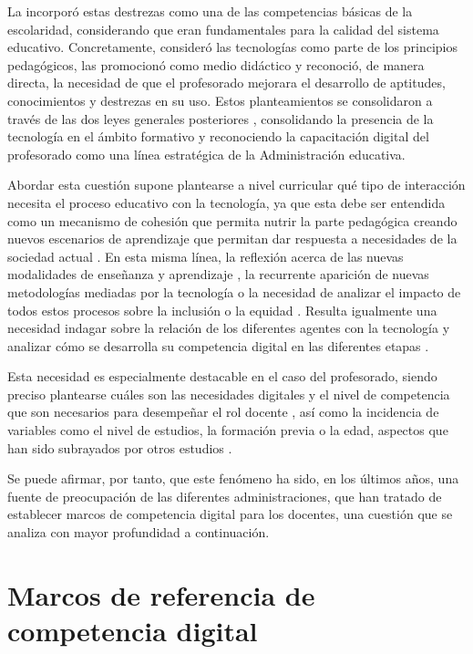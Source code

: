 \documentclass[spanish]{textolivre}
\begin{document}
La \textcite{de2006ley} incorporó estas destrezas como una de las competencias básicas de la escolaridad, considerando que eran fundamentales para la calidad del sistema educativo. Concretamente, consideró las tecnologías como parte de los principios pedagógicos, las promocionó como medio didáctico y reconoció, de manera directa, la necesidad de que el profesorado mejorara el desarrollo de aptitudes, conocimientos y destrezas en su uso. Estos planteamientos se consolidaron a través de las dos leyes generales posteriores \cite{de2013ley,de2020ley}, consolidando la presencia de la tecnología en el ámbito formativo y reconociendo la capacitación digital del profesorado como una línea estratégica de la Administración educativa.

Abordar esta cuestión supone plantearse a nivel curricular qué tipo de interacción necesita el proceso educativo con la tecnología, ya que esta debe ser entendida como un mecanismo de cohesión que permita nutrir la parte pedagógica creando nuevos escenarios de aprendizaje que permitan dar respuesta a necesidades de la sociedad actual \cite{luengo_horcajo_fortalezas_2021}. En esta misma línea, la reflexión acerca de las nuevas modalidades de enseñanza y aprendizaje \cite{lopez_belmonte_alisis_2019}, la recurrente aparición de nuevas metodologías mediadas por la tecnología \cite{gamez_guillen_efectos_2020} o la necesidad de analizar el impacto de todos estos procesos sobre la inclusión o la equidad \cite{basham2020opportunity}. Resulta igualmente una necesidad indagar sobre la relación de los diferentes agentes con la tecnología y analizar cómo se desarrolla su competencia digital en las diferentes etapas \cite{guitert_digital_2021}.

Esta necesidad es especialmente destacable en el caso del profesorado, siendo preciso plantearse cuáles son las necesidades digitales y el nivel de competencia que son necesarios para desempeñar el rol docente \cite{arillorente_desarrollo_2018}, así como la incidencia de variables como el nivel de estudios, la formación previa o la edad, aspectos que han sido subrayados por otros estudios \cite{garzon_artacho_competencia_2021}.

Se puede afirmar, por tanto, que este fenómeno ha sido, en los últimos años, una fuente de preocupación de las diferentes administraciones, que han tratado de establecer marcos de competencia digital para los docentes, una cuestión que se analiza con mayor profundidad a continuación.

\section{Marcos de referencia de competencia digital}
\end{document}
